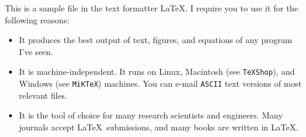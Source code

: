 \documentclass{article}
\begin{document}

\medskip
This is a sample file in the text formatter \LaTeX.
I require you to use it for the following reasons:

\begin{itemize}

\item{It produces the best output of text, figures,
      and equations of any
      program I've seen.}

\item{It is machine-independent. It runs on Linux, Macintosh (see {\tt TeXShop}), and Windows (see {\tt MiKTeX}) machines. 
     You can e-mail {\tt ASCII} text versions of most relevant files.}

\item{It is the tool of choice for many research
     scientists and engineers.
     Many journals accept 
     \LaTeX~submissions, and many books
     are written in \LaTeX.}

\end{itemize}
\end{document}
